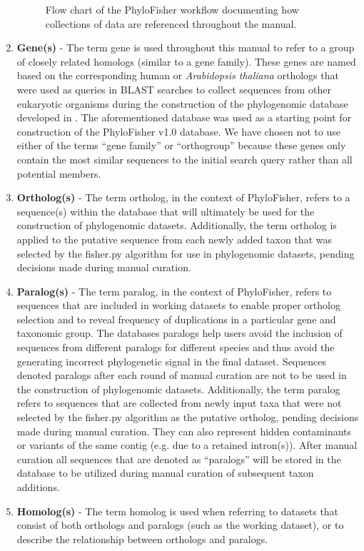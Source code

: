 \documentclass{article}
\begin{document}
\begin{enumerate}
\begin{figure}[H]
        	 \caption{Flow chart of the PhyloFisher workflow documenting how collections of data are referenced throughout the manual.}
        	 \label{Fig:terminology}
        \end{figure}
                \item \textbf{Gene(s)} - The term gene is used throughout this manual to refer to a group of closely related homologs (similar to a gene family). These genes are named based on the corresponding human or \textit{Arabidopsis thaliana} orthologs that were used as queries in BLAST searches to collect sequences from other eukaryotic organisms during the construction of the phylogenomic database developed in \cite{tice_expansion_2016}. The aforementioned database was used as a starting point for construction of the PhyloFisher v1.0 database. We have chosen not to use either of the terms “gene family” or “orthogroup” because these genes only contain the most similar sequences to the initial search query rather than all potential members.
                \item \textbf{Ortholog(s)} - The term ortholog, in the context of PhyloFisher, refers to a sequence(s) within the database that will ultimately be used for the construction of phylogenomic datasets. Additionally, the term ortholog is applied to the putative sequence from each newly added taxon that was selected by the fisher.py algorithm for use in phylogenomic datasets, pending decisions made during manual curation.
                \item \textbf{Paralog(s)} - The term paralog, in the context of PhyloFisher, refers to sequences that are included in working datasets to enable proper ortholog selection and to reveal frequency of duplications in a particular gene and taxonomic group. The databases paralogs help users  avoid the inclusion of sequences from different paralogs for different species and thus avoid the generating incorrect phylogenetic signal in the final dataset. Sequences denoted paralogs after each round of manual curation are not to be used in the construction of phylogenomic datasets. Additionally, the term paralog refers to sequences that are collected from newly input taxa that were not selected by the fisher.py algorithm as the putative ortholog, pending decisions made during manual curation. They can also represent hidden contaminants or variants of the same contig (e.g. due to a retained intron(s)). After manual curation all sequences that are denoted as “paralogs” will be stored in the database to be utilized during manual curation of subsequent taxon additions.
                \item \textbf{Homolog(s)} - The term homolog is used when referring to datasets that consist of both orthologs and paralogs (such as the working dataset), or to describe the relationship between orthologs and paralogs. 
            \end{enumerate}
            
\end{document}
